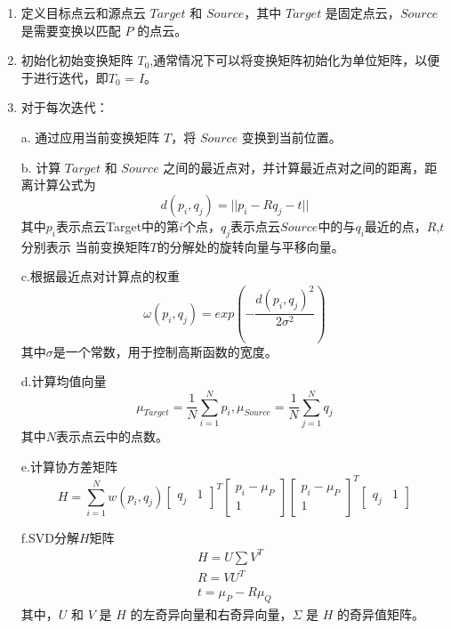 \begin{enumerate}
\item 定义目标点云和源点云 $Target$ 和 $Source$，其中 $Target$ 是固定点云，$Source$ 是需要变换以匹配 $P$ 的点云。

\item 初始化初始变换矩阵 $T_0$,通常情况下可以将变换矩阵初始化为单位矩阵，以便于进行迭代，即$T_0$ = $I$。

\item 对于每次迭代：

a. 通过应用当前变换矩阵 $T$，将 $Source$ 变换到当前位置。

b. 计算 $Target$ 和 $Source$ 之间的最近点对，并计算最近点对之间的距离，距离计算公式为
\begin{equation}
    d(p_i, q_j) = ||p_i - Rq_j - t||
\end{equation}
其中$p_i$表示点云Target中的第$i$个点，$q_j$表示点云$Source$中的与$q_i$最近的点，$R$,$t$分别表示
当前变换矩阵$T$的分解处的旋转向量与平移向量。

c.根据最近点对计算点的权重
\begin{equation}
    \omega (p_i, q_j) = exp(-\frac{d(p_i, q_j)^2}{2\sigma ^2})
\end{equation}
其中$\sigma$是一个常数，用于控制高斯函数的宽度。

d.计算均值向量
\begin{equation}
    \mu_{Target} = \frac{1}{N}\sum_{i = 1}^{N}p_i,  \mu_{Source} = \frac{1}{N}\sum_{j = 1}^{N}q_j
\end{equation}
其中$N$表示点云中的点数。

e.计算协方差矩阵
\begin{equation}
    H=\sum_{i=1}^{N} w\left(p_i, q_j\right)\left[\begin{array}{ll}
        q_j & 1
        \end{array}\right]^{T}\left[\begin{array}{c}
        p_i-\mu_P \\
        1
        \end{array}\right]\left[\begin{array}{c}
        p_i-\mu_P \\
        1
        \end{array}\right]^{T}\left[\begin{array}{ll}
        q_j & 1
        \end{array}\right]
\end{equation}

f.SVD分解$H$矩阵
\begin{equation}
    \begin{aligned}
    H = U \sum V^T \\
    R = VU^T \\
    t = \mu _P - R\mu _Q
    \end{aligned}
\end{equation}  
其中，$U$ 和 $V$ 是 $H$ 的左奇异向量和右奇异向量，$\Sigma$ 是 $H$ 的奇异值矩阵。


\end{enumerate}
